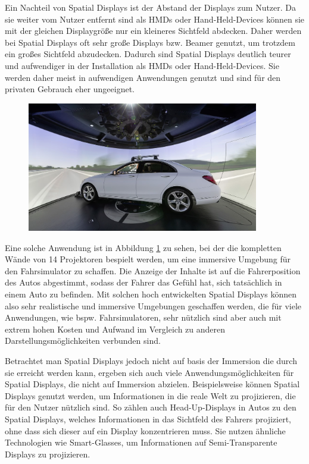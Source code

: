   Ein Nachteil von Spatial Displays ist der Abstand der Displays zum Nutzer.
  Da sie weiter vom Nutzer entfernt sind als HMDs oder Hand-Held-Devices können sie mit der gleichen Displaygröße nur ein kleineres Sichtfeld abdecken.
  Daher werden bei Spatial Displays oft sehr große Displays bzw. Beamer genutzt, um trotzdem ein großes Sichtfeld abzudecken.
  Dadurch sind Spatial Displays deutlich teurer und aufwendiger in der Installation als HMDs oder Hand-Held-Devices.
  Sie werden daher meist in aufwendigen Anwendungen genutzt und sind für den privaten Gebrauch eher ungeeignet.

  \begin{figure}[H]
    \centering
    \includegraphics[width=0.9\textwidth]{images/merc-sim.png}
    \label{fig:merc-sim}
  \end{figure}

  Eine solche Anwendung ist in Abbildung \ref{fig:merc-sim} zu sehen, bei der die kompletten Wände von 14 Projektoren bespielt werden, um eine immersive Umgebung für den Fahrsimulator zu schaffen.
  Die Anzeige der Inhalte ist auf die Fahrerposition des Autos abgestimmt, sodass der Fahrer das Gefühl hat, sich tatsächlich in einem Auto zu befinden.
  Mit solchen hoch entwickelten Spatial Displays können also sehr realistische und immersive Umgebungen geschaffen werden, die für viele Anwendungen, wie bspw. Fahrsimulatoren, sehr nützlich sind aber auch mit extrem hohen Kosten und Aufwand im Vergleich zu anderen Darstellungsmöglichkeiten verbunden sind.

  Betrachtet man Spatial Displays jedoch nicht auf basis der Immersion die durch sie erreicht werden kann, ergeben sich auch viele Anwendungsmöglichkeiten für Spatial Displays, die nicht auf Immersion abzielen.
  Beispielsweise können Spatial Displays genutzt werden, um Informationen in die reale Welt zu projizieren, die für den Nutzer nützlich sind.
  So zählen auch Head-Up-Displays in Autos zu den Spatial Displays, welches Informationen in das Sichtfeld des Fahrers projiziert, ohne dass sich dieser auf ein Display konzentrieren muss.
  Sie nutzen ähnliche Technologien wie Smart-Glasses, um Informationen auf Semi-Transparente Displays zu projizieren.

  